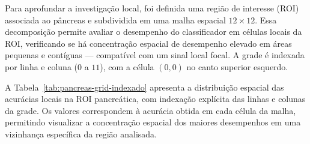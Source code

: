 \documentclass[11pt,a4paper]{article}
\begin{document}
Para aprofundar a investigação local, foi definida uma região de interesse (ROI) associada ao pâncreas e subdividida em uma malha espacial \(12\times 12\). Essa decomposição permite avaliar o desempenho do classificador em células locais da ROI, verificando se há concentração espacial de desempenho elevado em áreas pequenas e contíguas --- compatível com um sinal local focal. A grade é indexada por linha e coluna (\(0\) a \(11\)), com a célula \((0,0)\) no canto superior esquerdo.

A Tabela~\ref{tab:pancreas-grid-indexado} apresenta a distribuição espacial das acurácias locais na ROI pancreática, com indexação explícita das linhas e colunas da grade. Os valores correspondem à acurácia obtida em cada célula da malha, permitindo visualizar a concentração espacial dos maiores desempenhos em uma vizinhança específica da região analisada.
\end{document}
